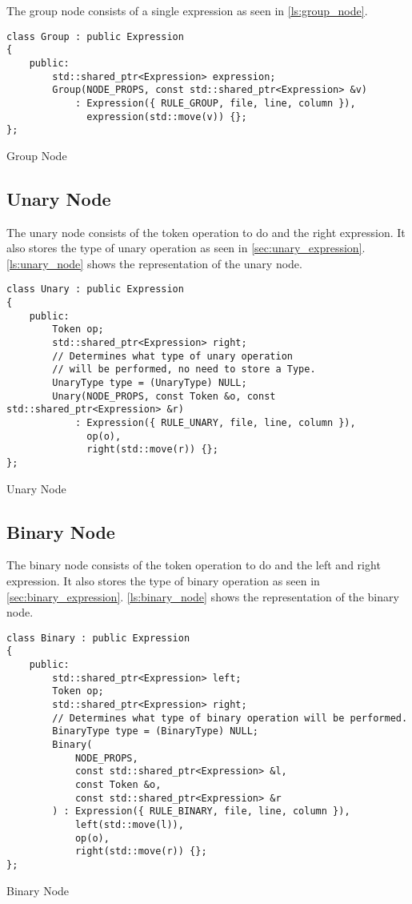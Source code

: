 The group node consists of a single expression as seen in \autoref{ls:group_node}.

\begin{listing}[H]
\begin{verbatim}
class Group : public Expression
{
    public:
        std::shared_ptr<Expression> expression;
        Group(NODE_PROPS, const std::shared_ptr<Expression> &v)
            : Expression({ RULE_GROUP, file, line, column }),
              expression(std::move(v)) {};
};
\end{verbatim}
\caption{Group Node}
\label{ls:group_node}
\end{listing}

\subsection{Unary Node}

The unary node consists of the token operation to do and the right expression. It also stores the type of unary operation as seen in
\autoref{sec:unary_expression}. \autoref{ls:unary_node} shows the representation of the unary node.

\begin{listing}[H]
\begin{verbatim}
class Unary : public Expression
{
    public:
        Token op;
        std::shared_ptr<Expression> right;
        // Determines what type of unary operation
        // will be performed, no need to store a Type.
        UnaryType type = (UnaryType) NULL;
        Unary(NODE_PROPS, const Token &o, const std::shared_ptr<Expression> &r)
            : Expression({ RULE_UNARY, file, line, column }),
              op(o),
              right(std::move(r)) {};
};
\end{verbatim}
\caption{Unary Node}
\label{ls:unary_node}
\end{listing}

\subsection{Binary Node}

The binary node consists of the token operation to do and the left and right expression. It also stores the type of binary operation as seen in
\autoref{sec:binary_expression}. \autoref{ls:binary_node} shows the representation of the binary node.

\begin{listing}[H]
\begin{verbatim}
class Binary : public Expression
{
    public:
        std::shared_ptr<Expression> left;
        Token op;
        std::shared_ptr<Expression> right;
        // Determines what type of binary operation will be performed.
        BinaryType type = (BinaryType) NULL;
        Binary(
            NODE_PROPS,
            const std::shared_ptr<Expression> &l,
            const Token &o,
            const std::shared_ptr<Expression> &r
        ) : Expression({ RULE_BINARY, file, line, column }),
            left(std::move(l)),
            op(o),
            right(std::move(r)) {};
};
\end{verbatim}
\caption{Binary Node}
\label{ls:binary_node}
\end{listing}

